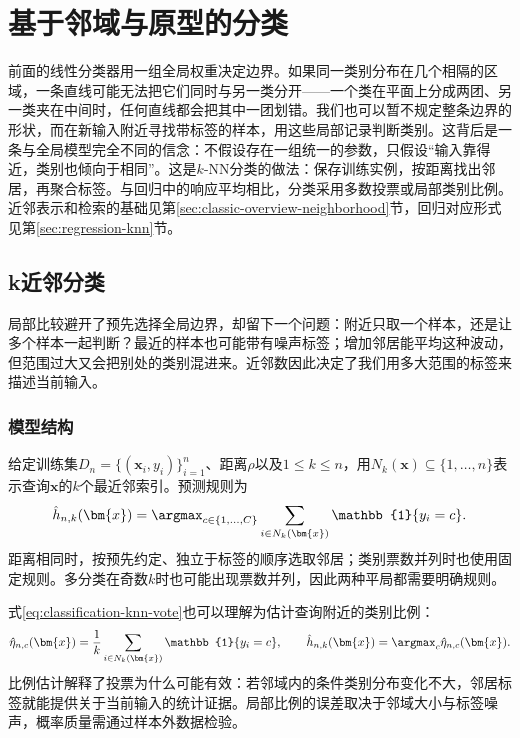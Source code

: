 \section{基于邻域与原型的分类}
\label{sec:classification-neighborhood}

前面的线性分类器用一组全局权重决定边界。如果同一类别分布在几个相隔的区域，一条直线可能无法把它们同时与另一类分开——一个类在平面上分成两团、另一类夹在中间时，任何直线都会把其中一团划错。我们也可以暂不规定整条边界的形状，而在新输入附近寻找带标签的样本，用这些局部记录判断类别。这背后是一条与全局模型完全不同的信念：不假设存在一组统一的参数，只假设“输入靠得近，类别也倾向于相同”。这是$k$-NN分类的做法：保存训练实例，按距离找出邻居，再聚合标签。与回归中的响应平均相比，分类采用多数投票或局部类别比例。近邻表示和检索的基础见第\ref{sec:classic-overview-neighborhood}节，回归对应形式见第\ref{sec:regression-knn}节。

\subsection{k近邻分类}
\label{sec:classification-knn}

局部比较避开了预先选择全局边界，却留下一个问题：附近只取一个样本，还是让多个样本一起判断？最近的样本也可能带有噪声标签；增加邻居能平均这种波动，但范围过大又会把别处的类别混进来。近邻数因此决定了我们用多大范围的标签来描述当前输入。

\subsubsection{模型结构}
\label{sec:classification-knn-structure}

给定训练集$D_n=\{(\bm{x}_i,y_i)\}_{i=1}^n$、距离$\rho$以及$1\leq k\leq n$，用$N_k(\bm{x})\subseteq\{1,\ldots,n\}$表示查询$\bm{x}$的$k$个最近邻索引。预测规则为
\begin{equation}
  \hat h_{n,k}(\bm{x})
  =\argmax_{c\in\{1,\ldots,C\}}
  \sum_{i\in N_k(\bm{x})}\mathbb{1}\{y_i=c\}.
  \label{eq:classification-knn-vote}
\end{equation}
距离相同时，按预先约定、独立于标签的顺序选取邻居；类别票数并列时也使用固定规则。多分类在奇数$k$时也可能出现票数并列，因此两种平局都需要明确规则。

式\eqref{eq:classification-knn-vote}也可以理解为估计查询附近的类别比例：
\begin{equation}
  \hat\eta_{n,c}(\bm{x})
  =\frac{1}{k}\sum_{i\in N_k(\bm{x})}\mathbb{1}\{y_i=c\},
  \qquad
  \hat h_{n,k}(\bm{x})=\argmax_c\hat\eta_{n,c}(\bm{x}).
  \label{eq:classification-knn-posterior}
\end{equation}
比例估计解释了投票为什么可能有效：若邻域内的条件类别分布变化不大，邻居标签就能提供关于当前输入的统计证据。局部比例的误差取决于邻域大小与标签噪声，概率质量需通过样本外数据检验。

